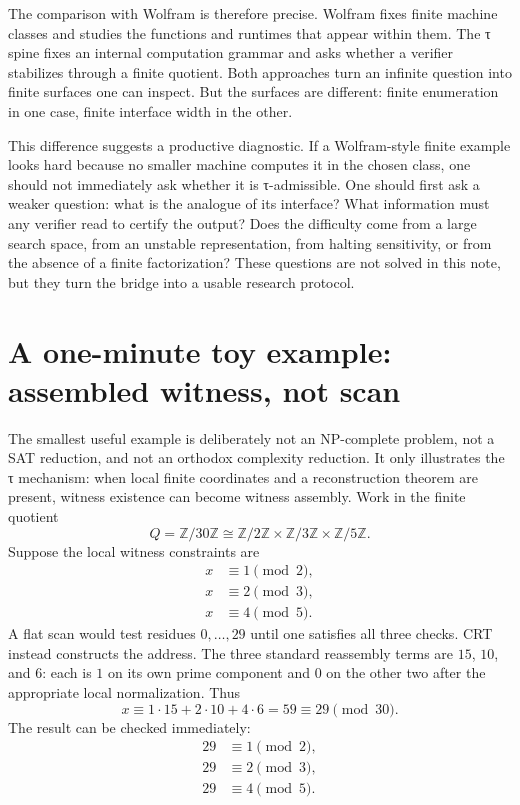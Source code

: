 \documentclass{pantarhei-researchnote}
\begin{document}
The comparison with Wolfram is therefore precise. Wolfram fixes finite
machine classes and studies the functions and runtimes that appear within
them. The τ spine fixes an internal computation grammar and asks whether a
verifier stabilizes through a finite quotient. Both approaches turn an
infinite question into finite surfaces one can inspect. But the surfaces
are different: finite enumeration in one case, finite interface width in
the other.

This difference suggests a productive diagnostic. If a Wolfram-style
finite example looks hard because no smaller machine computes it in the
chosen class, one should not immediately ask whether it is τ-admissible.
One should first ask a weaker question: what is the analogue of its
interface? What information must any verifier read to certify the output?
Does the difficulty come from a large search space, from an unstable
representation, from halting sensitivity, or from the absence of a finite
factorization? These questions are not solved in this note, but they
turn the bridge into a usable research protocol.

\section{A one-minute toy example: assembled witness, not scan}
\label{sec:toy-example}

The smallest useful example is deliberately not an NP-complete problem,
not a SAT reduction, and not an orthodox complexity reduction. It only
illustrates the τ mechanism: when local finite coordinates and a
reconstruction theorem are present, witness existence can become witness
assembly. Work in the finite quotient
\[
  Q=\mathbb{Z}/30\mathbb{Z}
  \cong
  \mathbb{Z}/2\mathbb{Z}\times
  \mathbb{Z}/3\mathbb{Z}\times
  \mathbb{Z}/5\mathbb{Z}.
\]
Suppose the local witness constraints are
\[
  \begin{aligned}
  x &\equiv 1 \pmod 2,\\
  x &\equiv 2 \pmod 3,\\
  x &\equiv 4 \pmod 5.
  \end{aligned}
\]
A flat scan would test residues \(0,\ldots,29\) until one satisfies all
three checks. CRT instead constructs the address. The three standard
reassembly terms are \(15\), \(10\), and \(6\): each is \(1\) on its own
prime component and \(0\) on the other two after the appropriate local
normalization. Thus
\[
  x \equiv 1\cdot 15 + 2\cdot 10 + 4\cdot 6
  =59 \equiv 29 \pmod {30}.
\]
The result can be checked immediately:
\[
  \begin{aligned}
  29&\equiv 1 \pmod 2,\\
  29&\equiv 2 \pmod 3,\\
  29&\equiv 4 \pmod 5.
  \end{aligned}
\]
\end{document}
